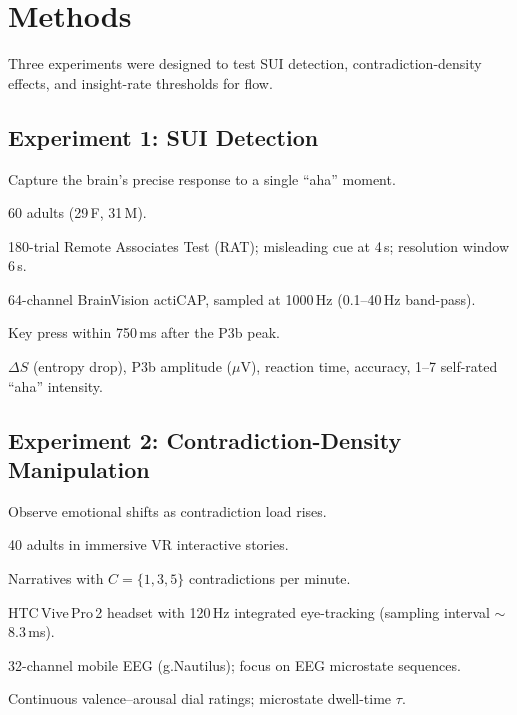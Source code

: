 \documentclass[12pt,a4paper]{article}
\begin{document}
\newpage

\section{Methods}
Three experiments were designed to test SUI detection, contradiction-density effects, and insight-rate thresholds for flow.

\subsection{Experiment 1: SUI Detection}
\begin{description}[style=nextline,leftmargin=2.8cm,labelsep=0.4cm]
  \item[Goal] Capture the brain’s precise response to a single ``aha'' moment.
  \item[Participants] 60 adults (29\,F, 31\,M).
  \item[Task] 180-trial Remote Associates Test (RAT); misleading cue at 4\,s; resolution window 6\,s.
  \item[EEG Setup] 64-channel BrainVision actiCAP, sampled at 1000\,Hz (0.1--40\,Hz band-pass).
  \item[SUI Marker] Key press within 750\,ms after the P3b peak.
  \item[Measures] $\Delta S$ (entropy drop), P3b amplitude ($\mu$V), reaction time, accuracy, 1--7 self-rated ``aha'' intensity.
\end{description}

\subsection{Experiment 2: Contradiction-Density Manipulation}
\begin{description}[style=nextline,leftmargin=2.8cm,labelsep=0.4cm]
  \item[Goal] Observe emotional shifts as contradiction load rises.
  \item[Participants] 40 adults in immersive VR interactive stories.
  \item[Procedure] Narratives with $C = \{1, 3, 5\}$ contradictions per minute.
  \item[VR Hardware] HTC\,Vive\,Pro\,2 headset with 120\,Hz integrated eye-tracking (sampling interval $\sim$8.3\,ms).
  \item[EEG Setup] 32-channel mobile EEG (g.Nautilus); focus on EEG microstate sequences.
  \item[Measures] Continuous valence--arousal dial ratings; microstate dwell-time $\tau$.
\end{description}
\end{document}
